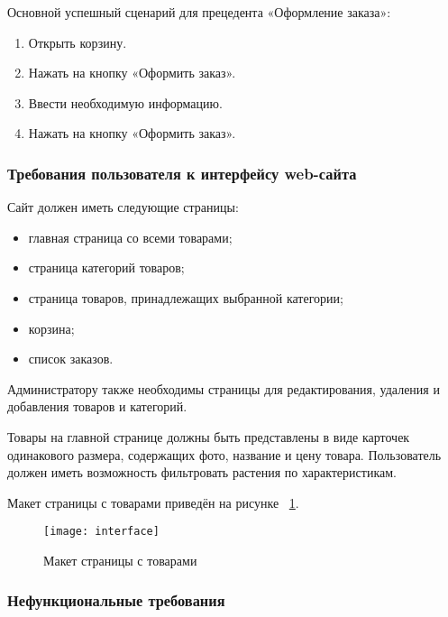 Основной успешный сценарий для прецедента «Оформление заказа»:
\begin{enumerate}
	\item Открыть корзину.
	\item Нажать на кнопку «Оформить заказ».
	\item Ввести необходимую информацию.
	\item Нажать на кнопку «Оформить заказ».
\end{enumerate}

\subsubsection{Требования пользователя к интерфейсу web-сайта}

Сайт должен иметь следующие страницы:
\begin{itemize}
	\item главная страница со всеми товарами;
	\item страница категорий товаров;
	\item страница товаров, принадлежащих выбранной категории;
	\item корзина;
	\item список заказов.
\end{itemize}

Администратору также необходимы страницы для редактирования, удаления и добавления товаров и категорий.

Товары на главной странице должны быть представлены в виде карточек одинакового размера, содержащих фото, название и цену товара. Пользователь должен иметь возможность фильтровать растения по характеристикам.

Макет страницы с товарами приведён на рисунке ~\ref{interface:image}.

\begin{figure}[H]
	\texttt{[image: interface]}
	\caption{Макет страницы с товарами}
	\label{interface:image}
\end{figure}

\subsubsection{Нефункциональные требования}

